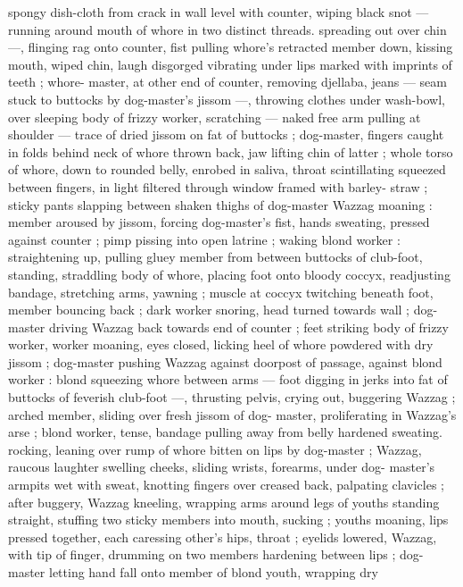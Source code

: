 spongy dish-cloth from crack in wall level with counter, wiping black 
snot --- running around mouth of whore in two distinct threads. 
spreading out over chin ---, flinging rag onto counter, fist pulling 
whore's retracted member down, kissing mouth, wiped chin, laugh 
disgorged vibrating under lips marked with imprints of teeth ; whore- 
master, at other end of counter, removing djellaba, jeans --- seam 
stuck to buttocks by dog-master's jissom ---, throwing clothes under 
wash-bowl, over sleeping body of frizzy worker, scratching --- naked 
free arm pulling at shoulder --- trace of dried jissom on fat of 
buttocks ; dog-master, fingers caught in folds behind neck of whore 
thrown back, jaw lifting chin of latter ; whole torso of whore, down to 
rounded belly, enrobed in saliva, throat scintillating squeezed 
between fingers, in light filtered through window framed with barley- 
straw ; sticky pants slapping between shaken thighs of dog-master 
Wazzag moaning : member aroused by jissom, forcing dog-master's 
fist, hands sweating, pressed against counter ; pimp pissing into 
open latrine ; waking blond worker : straightening up, pulling gluey 
member from between buttocks of club-foot, standing, straddling 
body of whore, placing foot onto bloody coccyx, readjusting 
bandage, stretching arms, yawning ; muscle at coccyx twitching 
beneath foot, member bouncing back ; dark worker snoring, head 
turned towards wall ; dog-master driving Wazzag back towards end 
of counter ; feet striking body of frizzy worker, worker moaning, eyes 
closed, licking heel of whore powdered with dry jissom ; dog-master 
pushing Wazzag against doorpost of passage, against blond worker 
: blond squeezing whore between arms --- foot digging in jerks into 
fat of buttocks of feverish club-foot ---, thrusting pelvis, crying out, 
buggering Wazzag ; arched member, sliding over fresh jissom of dog- 
master, proliferating in Wazzag's arse ; blond worker, tense, bandage 
pulling away from belly hardened sweating. rocking, leaning over 
rump of whore bitten on lips by dog-master ; Wazzag, raucous 
laughter swelling cheeks, sliding wrists, forearms, under dog- 
master's armpits wet with sweat, knotting fingers over creased back, 
palpating clavicles ; after buggery, Wazzag kneeling, wrapping arms 
around legs of youths standing straight, stuffing two sticky members 
into mouth, sucking ; youths moaning, lips pressed together, each 
caressing other's hips, throat ; eyelids lowered, Wazzag, with tip of 
finger, drumming on two members hardening between lips ; dog- 
master letting hand fall onto member of blond youth, wrapping dry 
